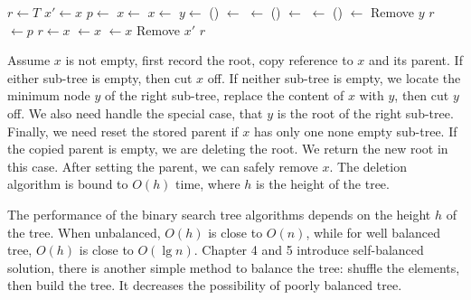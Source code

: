 \documentclass[b5paper]{article}
\begin{document}
\begin{algorithmic}[1]
  \State $r \gets T$
  \State $x' \gets x$ 
  \State $p \gets $ 
    \State $x \gets $ 
    \State $x \gets $ 
  \Else
    \State  $y \gets $ ()
    \State {} $\gets$ 
    \State {} $\gets$ 
      \State {}() $\gets$ 
    \Else
      \State {} $\gets$ 
    \EndIf
      \State {}() $\gets$ 
    \EndIf
    \State Remove $y$
    \State \Return $r$
  \EndIf
    \State {} $\gets p$
  \EndIf
    \State $r \gets x$
  \Else
      \State {} $\gets x$
    \Else
      \State {} $\gets x$
    \EndIf
  \EndIf
  \State Remove $x'$
  \State \Return $r$
\EndFunction
\end{algorithmic}

Assume $x$ is not empty, first record the root, copy reference to $x$ and its parent. If either sub-tree is empty, then cut $x$ off. If neither sub-tree is empty, we locate the minimum node $y$ of the right sub-tree, replace the content of $x$ with $y$, then cut $y$ off. We also need handle the special case, that $y$ is the root of the right sub-tree. Finally, we need reset the stored parent if $x$ has only one none empty sub-tree. If the copied parent is empty, we are deleting the root. We return the new root in this case. After setting the parent, we can safely remove $x$. The deletion algorithm is bound to $O(h)$ time, where $h$ is the height of the tree.

The performance of the binary search tree algorithms depends on the height $h$ of the tree. When unbalanced, $O(h)$ is close to $O(n)$, while for well balanced tree, $O(h)$ is close to $O(\lg n)$. Chapter 4 and 5 introduce self-balanced solution, there is another simple method to balance the tree: shuffle the elements, then build the tree\cite{CLRS}. It decreases the possibility of poorly balanced tree.
\end{document}
